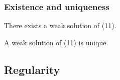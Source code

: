 \subsubsection{Existence and uniqueness}

\begin{theorem}
    There exists a weak solution of (11).
\end{theorem}


\begin{theorem}
    A weak solution of (11) is unique.
\end{theorem}

\subsection{Regularity}











































